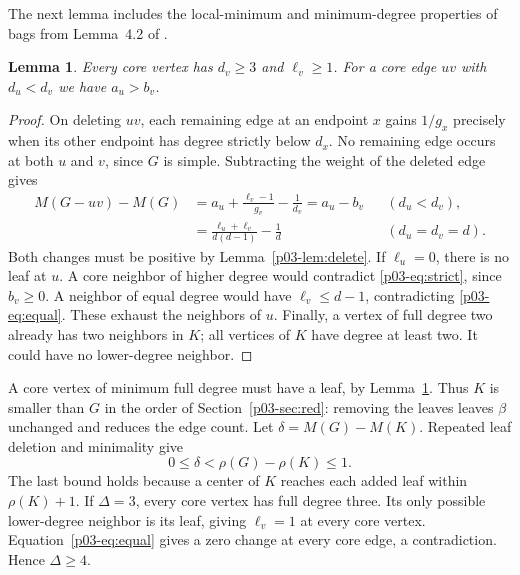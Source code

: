 \documentclass[11pt,a4paper]{article}
\newtheorem{lemma}[theorem]{Lemma}\newtheorem{corollary}[theorem]{Corollary}
\begin{document}
The next lemma includes the local-minimum and minimum-degree properties
of bags from Lemma~4.2 of \cite{p03-CPS}.
\begin{lemma}\label{p03-lem:local}
Every core vertex has $d_v\ge3$ and $\ell_v\ge1$. For a core edge $uv$
with $d_u<d_v$ we have $a_u>b_v$.
\end{lemma}
\begin{proof}
On deleting $uv$, each remaining edge at an endpoint $x$ gains $1/g_x$
precisely when its other endpoint has degree strictly below $d_x$.
No remaining edge occurs at both $u$ and $v$, since $G$ is simple.
Subtracting the weight of the deleted edge gives
\begin{align}
 M(G-uv)-M(G)
 &=a_u+\frac{\ell_v-1}{g_v}-\frac1{d_v}
   =a_u-b_v &&(d_u<d_v),\label{p03-eq:strict}\\
 &=\frac{\ell_u+\ell_v}{d(d-1)}-\frac1d
   &&(d_u=d_v=d).\label{p03-eq:equal}
\end{align}
Both changes must be positive by Lemma~\ref{p03-lem:delete}. If
$\ell_u=0$, there is no leaf at $u$. A core neighbor of higher degree
would contradict \eqref{p03-eq:strict}, since $b_v\ge0$. A neighbor of
equal degree would have $\ell_v\le d-1$, contradicting
\eqref{p03-eq:equal}. These exhaust the neighbors of $u$. Finally, a
vertex of full degree two already has two neighbors in $K$; all
vertices of $K$ have degree at least two. It could have no lower-degree
neighbor.
\end{proof}

A core vertex of minimum full degree must have a leaf, by
Lemma~\ref{p03-lem:local}. Thus $K$ is smaller than $G$ in the order of
Section~\ref{p03-sec:red}: removing the leaves leaves $\beta$ unchanged
and reduces the edge count. Let $\delta=M(G)-M(K)$. Repeated leaf
deletion and minimality give
\begin{equation}\label{p03-eq:delta}
 0\le\delta<\rho(G)-\rho(K)\le1 .
\end{equation}
The last bound holds because a center of $K$ reaches each added leaf
within $\rho(K)+1$. If $\Delta=3$, every core vertex has full degree
three. Its only possible lower-degree neighbor is its leaf, giving
$\ell_v=1$ at every core vertex. Equation~\eqref{p03-eq:equal} gives a
zero change at every core edge, a contradiction. Hence $\Delta\ge4$.
\end{document}
